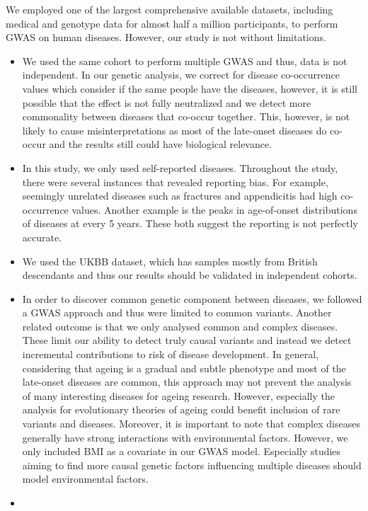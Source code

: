 \documentclass[12pt,twoside]{unicam}
\providecommand{\tightlist}{%
  \setlength{\itemsep}{0pt}\setlength{\parskip}{0pt}}
\begin{document}
We employed one of the largest comprehensive available datasets, including medical and genotype data for almost half a million participants, to perform GWAS on human diseases. However, our study is not without limitations.

\begin{itemize}
\tightlist
\item
  We used the same cohort to perform multiple GWAS and thus, data is not independent. In our genetic analysis, we correct for disease co-occurrence values which consider if the same people have the diseases, however, it is still possible that the effect is not fully neutralized and we detect more commonality between diseases that co-occur together. This, however, is not likely to cause misinterpretations as most of the late-onset diseases do co-occur and the results still could have biological relevance.
\item
  In this study, we only used self-reported diseases. Throughout the study, there were several instances that revealed reporting bias. For example, seemingly unrelated diseases such as fractures and appendicitis had high co-occurrence values. Another example is the peaks in age-of-onset distributions of diseases at every 5 years. These both suggest the reporting is not perfectly accurate.
\item
  We used the UKBB dataset, which has samples mostly from British descendants and thus our results should be validated in independent cohorts.
\item
  In order to discover common genetic component between diseases, we followed a GWAS approach and thus were limited to common variants. Another related outcome is that we only analysed common and complex diseases. These limit our ability to detect truly causal variants and instead we detect incremental contributions to risk of disease development. In general, considering that ageing is a gradual and subtle phenotype and most of the late-onset diseases are common, this approach may not prevent the analysis of many interesting diseases for ageing research. However, especially the analysis for evolutionary theories of ageing could benefit inclusion of rare variants and diseases. Moreover, it is important to note that complex diseases generally have strong interactions with environmental factors. However, we only included BMI as a covariate in our GWAS model. Especially studies aiming to find more causal genetic factors influencing multiple diseases should model environmental factors.
\item

\end{itemize}
\end{document}
